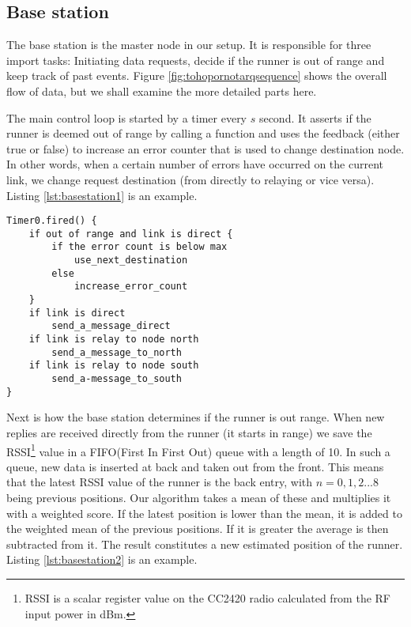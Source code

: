 \subsection{Base station}\label{sc:basestation}

The base station is the master node in our setup. It is responsible for three import tasks: Initiating data requests, decide if the runner is out of range and keep track of past events. Figure \ref{fig:tohopornotarqsequence} shows the overall flow of data, but we shall examine the more detailed parts here.

\noindent The main control loop is started by a timer every $s$ second. It asserts if the runner is deemed out of range by calling a function and uses the feedback (either true or false) to increase an error counter that is used to change destination node. In other words, when a certain number of errors have occurred on the current link, we change request destination (from directly to relaying or vice versa). Listing \ref{lst:basestation1} is an example.
\noindent
\begin{minipage}[t]{0.95\linewidth}
	\begin{lstlisting}[caption=XXX, label={lst:basestation1}]
Timer0.fired() {
	if out of range and link is direct {
		if the error count is below max
			use_next_destination
		else
			increase_error_count
	}
	if link is direct
		send_a_message_direct
	if link is relay to node north
		send_a_message_to_north
	if link is relay to node south
		send_a-message_to_south
}
	\end{lstlisting}
\end{minipage}

\noindent Next is how the base station determines if the runner is out range. When new replies are received directly from the runner (it starts in range) we save the RSSI\footnote{RSSI is a scalar register value on the CC2420 radio calculated from the RF input power in dBm.} value in a FIFO(First In First Out) queue with a length of 10. In such a queue, new data is inserted at back and taken out from the front. This means that the latest RSSI value of the runner is the back entry, with $n=0,1,2 ... 8$ being previous positions. Our algorithm takes a mean of these and multiplies it with a weighted score. If the latest position is lower than the mean, it is added to the weighted mean of the previous positions. If it is greater the average is then subtracted from it. The result constitutes a new estimated position of the runner. Listing \ref{lst:basestation2} is an example.

